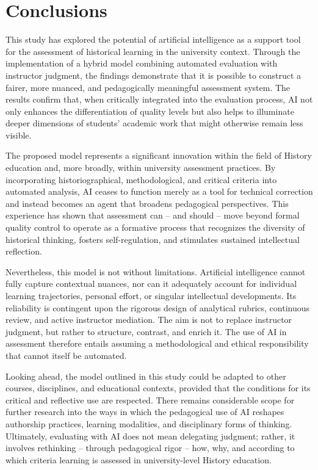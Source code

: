 \documentclass[english]{textolivre}
\begin{document}
\section{Conclusions}
This study has explored the potential of artificial intelligence as a support tool for the assessment of historical learning in the university context. Through the implementation of a hybrid model combining automated evaluation with instructor judgment, the findings demonstrate that it is possible to construct a fairer, more nuanced, and pedagogically meaningful assessment system. The results confirm that, when critically integrated into the evaluation process, AI not only enhances the differentiation of quality levels but also helps to illuminate deeper dimensions of students’ academic work that might otherwise remain less visible.

The proposed model represents a significant innovation within the field of History education and, more broadly, within university assessment practices. By incorporating historiographical, methodological, and critical criteria into automated analysis, AI ceases to function merely as a tool for technical correction and instead becomes an agent that broadens pedagogical perspectives. This experience has shown that assessment can -- and should -- move beyond formal quality control to operate as a formative process that recognizes the diversity of historical thinking, fosters self-regulation, and stimulates sustained intellectual reflection.

Nevertheless, this model is not without limitations. Artificial intelligence cannot fully capture contextual nuances, nor can it adequately account for individual learning trajectories, personal effort, or singular intellectual developments. Its reliability is contingent upon the rigorous design of analytical rubrics, continuous review, and active instructor mediation. The aim is not to replace instructor judgment, but rather to structure, contrast, and enrich it. The use of AI in assessment therefore entails assuming a methodological and ethical responsibility that cannot itself be automated.

Looking ahead, the model outlined in this study could be adapted to other courses, disciplines, and educational contexts, provided that the conditions for its critical and reflective use are respected. There remains considerable scope for further research into the ways in which the pedagogical use of AI reshapes authorship practices, learning modalities, and disciplinary forms of thinking. Ultimately, evaluating with AI does not mean delegating judgment; rather, it involves rethinking -- through pedagogical rigor -- how, why, and according to which criteria learning is assessed in university-level History education.
\end{document}
